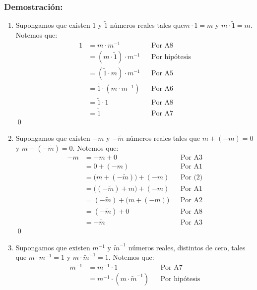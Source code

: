 \documentclass[11pt]{article}
\begin{document}
\subsubsection*{Demostración:}
\begin{enumerate}[label=\alph*)]

    \item Supongamos que existen $1$ y $\tilde{1}$ números reales tales que$m\cdot 1=m$ y $m\cdot\tilde{1}=m$. Notemos que:
        \begin{align*}
        1 &= m \cdot m^{-1} && \text{Por A8}\\
        &= \left( m \cdot \tilde{1} \right) \cdot m^{-1} && \text{Por hipótesis}\\
        &= \left( \tilde{1} \cdot m \right) \cdot m^{-1} && \text{Por A5}\\
        &= \tilde{1} \cdot \left( m \cdot m^{-1} \right) && \text{Por A6}\\
        &= \tilde{1} \cdot 1 && \text{Por A8}\\
        &= \tilde{1} && \text{Por A7}
        \end{align*} \qed
    \item Supongamos que existen $-m$ y $-\tilde{m}$ números reales tales que $m + \left(-m\right) = 0$ y $m + \left(- \tilde{m}\right) = 0$. Notemos que:
        \begin{align*}
        -m &= -m+0 && \text{Por A3}\\
        &= 0+\left(-m\right) && \text{Por A1}\\
        &= \bigl(m+\left(-\tilde{m} \right)\bigr)+\left(-m\right) && \text{Por (2)}\\
        &= \bigl(\left(-\tilde{m} \right)+m\bigr)+\left(-m\right) && \text{Por A1}\\
        &= \left(-\tilde{m} \right)+\bigl(m+\left(-m\right)\bigr) && \text{Por A2}\\
        &= \left(-\tilde{m} \right)+0 && \text{Por A8}\\
        &= -\tilde{m} && \text{Por A3}
        \end{align*} \qed
    \item Supongamos que existen $m^{-1}$ y $\tilde{m}^{-1}$ números reales, distintos de cero, tales que $m \cdot m^{-1} = 1$ y $m \cdot \tilde{m}^{-1} = 1$. Notemos que:
        \begin{align*}
        m^{-1} &= m^{-1} \cdot 1 && \text{Por A7} \\
        &= m^{-1} \cdot \left(m \cdot \tilde{m}^{-1} \right) && \text{Por hipótesis} \\

\end{align*}
\end{enumerate}
\end{document}

